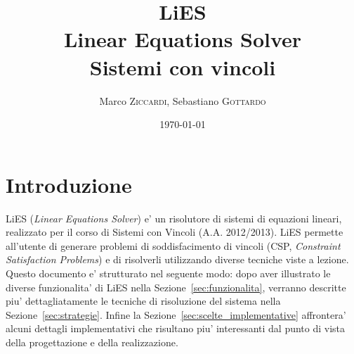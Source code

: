 \documentclass{article}
\title{LiES \\ Linear Equations Solver \\ Sistemi con vincoli} %
\author{Marco \textsc{Ziccardi}, Sebastiano \textsc{Gottardo}} %
\date{\today} %
\begin{document}
\maketitle %



\newpage
\tableofcontents
\newpage


\section{Introduzione}
\label{sec:introduzione}

LiES (\textit{Linear Equations Solver}) e' un risolutore di sistemi di equazioni lineari, realizzato per il corso di Sistemi con Vincoli (A.A. 2012/2013). LiES permette all'utente di generare problemi di soddisfacimento di vincoli (CSP, \textit{Constraint Satisfaction Problems}) e di risolverli utilizzando diverse tecniche viste a lezione.\\

Questo documento e' strutturato nel seguente modo: dopo aver illustrato le diverse funzionalita' di LiES nella Sezione~\ref{sec:funzionalita}, verranno descritte piu' dettagliatamente le tecniche di risoluzione del sistema nella Sezione~\ref{sec:strategie}. Infine la Sezione~\ref{sec:scelte_implementative} affrontera' alcuni dettagli implementativi che risultano piu' interessanti dal punto di vista della progettazione e della realizzazione.

\end{document}
